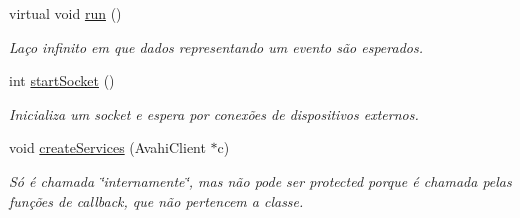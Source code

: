 \begin{DoxyCompactItemize}
virtual void \hyperlink{classbr_1_1ufscar_1_1lince_1_1mmi_1_1zeroconf_1_1CommunicationManager_a3f1607eb5807f50ee40882543220d0fb}{run} ()
\begin{DoxyCompactList}\small\item\em Laço infinito em que dados representando um evento são esperados. \item\end{DoxyCompactList}\item 
int \hyperlink{classbr_1_1ufscar_1_1lince_1_1mmi_1_1zeroconf_1_1CommunicationManager_ae914529050d209469d98e2f03e42ce85}{startSocket} ()
\begin{DoxyCompactList}\small\item\em Inicializa um socket e espera por conexões de dispositivos externos. \item\end{DoxyCompactList}\item 
void \hyperlink{classbr_1_1ufscar_1_1lince_1_1mmi_1_1zeroconf_1_1CommunicationManager_a9255db8e4fc96b6cd99b3ba67c4e79e5}{createServices} (AvahiClient $\ast$c)
\begin{DoxyCompactList}\small\item\em Só é chamada \char`\"{}internamente\char`\"{}, mas não pode ser protected porque é chamada pelas funções de callback, que não pertencem a classe. \item\end{DoxyCompactList}\end{DoxyCompactItemize}
